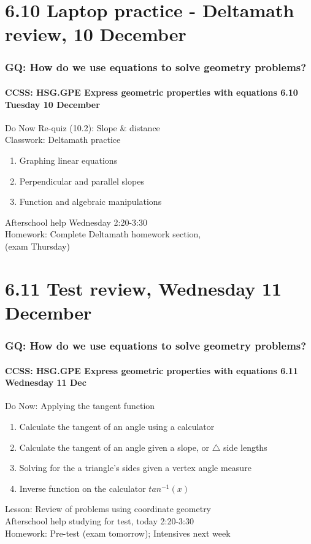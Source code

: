 \documentclass{beamer}
\begin{document}
\section{6.10 Laptop practice - Deltamath review, 10 December}
  \frame
  {
  \frametitle{GQ: How do we use equations to solve geometry problems?}
  \framesubtitle{CCSS: HSG.GPE Express geometric properties with equations \hfill \alert{6.10 Tuesday 10 December}}

  \begin{block}{Do Now Re-quiz (10.2): Slope \& distance \\[0.25cm] 
    Classwork: Deltamath practice}
  \begin{enumerate}
    \item Graphing linear equations
    \item Perpendicular and parallel slopes
    \item Function and algebraic manipulations
  \end{enumerate}
  \end{block}
  Afterschool help Wednesday 2:20-3:30\\[0.25cm]
  Homework: Complete Deltamath homework section, \\(\alert{exam Thursday})
  }

\section{6.11 Test review, Wednesday 11 December}
\frame
{
  \frametitle{GQ: How do we use equations to solve geometry problems?}
  \framesubtitle{CCSS: HSG.GPE Express geometric properties with equations \hfill \alert{6.11 Wednesday 11 Dec}}

  \begin{block}{Do Now: Applying the tangent function}
  \begin{enumerate}
    \item Calculate the tangent of an angle using a calculator
    \item Calculate the tangent of an angle given a slope, or $\triangle$ side lengths
    \item Solving for the a triangle's sides given a vertex angle measure
    \item Inverse function on the calculator $tan^{-1}(x)$
  \end{enumerate}
  \end{block}
  Lesson: Review of problems using coordinate geometry \\
  Afterschool help studying for test, today 2:20-3:30\\[0.25cm]
  Homework: Pre-test (\alert{exam tomorrow}); Intensives next week
}
\end{document}
